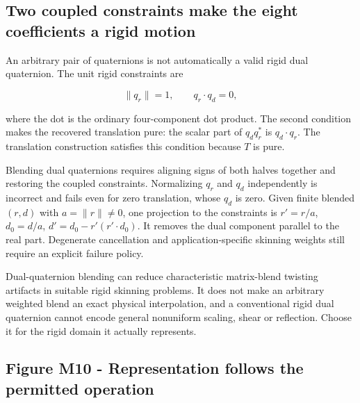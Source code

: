 \subsection{Two coupled constraints make the eight coefficients a rigid motion}\label{01-foundations-i-ch019-two-coupled-constraints-make-the-eight-coefficients-a-rigid-motion}

\hypertarget{01-foundations-i-ch019-two-coupled-constraints-make-the-eight-coefficients-a-rigid-motion}{}

An arbitrary pair of quaternions is not automatically a valid rigid dual quaternion. The unit rigid constraints are

\[
\|q_r\|=1,\qquad q_r\cdot q_d=0,
\]

where the dot is the ordinary four-component dot product. The second condition makes the recovered translation pure: the scalar part of \(q_dq_r^*\) is \(q_d\cdot q_r\). The translation construction satisfies this condition because \(T\) is pure.

Blending dual quaternions requires aligning signs of both halves together and restoring the coupled constraints. Normalizing \(q_r\) and \(q_d\) independently is incorrect and fails even for zero translation, whose \(q_d\) is zero. Given finite blended \((r,d)\) with \(a=\|r\|\ne0\), one projection to the constraints is \(r'=r/a\), \(d_0=d/a\), \(d'=d_0-r'(r'\cdot d_0)\). It removes the dual component parallel to the real part. Degenerate cancellation and application-specific skinning weights still require an explicit failure policy.

Dual-quaternion blending can reduce characteristic matrix-blend twisting artifacts in suitable rigid skinning problems. It does not make an arbitrary weighted blend an exact physical interpolation, and a conventional rigid dual quaternion cannot encode general nonuniform scaling, shear or reflection. Choose it for the rigid domain it actually represents.

\subsection{Figure M10 - Representation follows the permitted operation}\label{01-foundations-i-ch019-figure-m10---representation-follows-the-permitted-operation}

\hypertarget{01-foundations-i-ch019-figure-m10---representation-follows-the-permitted-operation}{}


